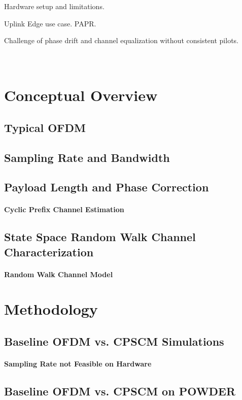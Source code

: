 \documentclass[12pt]{report}
\begin{document}
Hardware setup and limitations.

Uplink Edge use case. PAPR.

Challenge of phase drift and channel equalization without consistent pilots.\\\\\\

\section*{Conceptual Overview}
\subsection*{Typical OFDM}
\subsection*{Sampling Rate and Bandwidth}
\subsection*{Payload Length and Phase Correction}
\paragraph*{Cyclic Prefix Channel Estimation}
\subsection*{State Space Random Walk Channel Characterization}
\paragraph*{Random Walk Channel Model} 
\section*{Methodology}

\subsection*{Baseline OFDM vs. CPSCM Simulations}
\paragraph*{Sampling Rate not Feasible on Hardware}

\subsection*{Baseline OFDM vs. CPSCM on POWDER}
\end{document}
